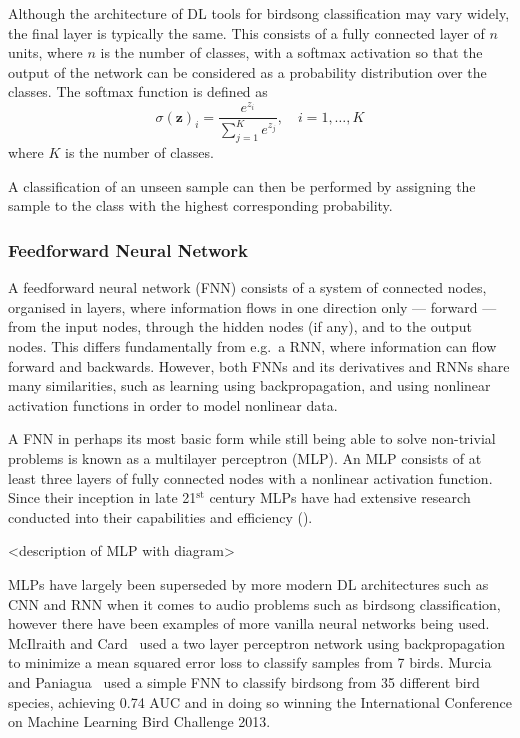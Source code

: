 Although the architecture of DL tools for birdsong classification may vary
widely, the final layer is typically the same. This consists of a fully
connected layer of $n$ units, where $n$ is the number of classes, with a softmax
activation so that the output of the network can be considered as a probability
distribution over the classes. The softmax function is defined as
\begin{equation}
\sigma{(\mathbf{z})}_i = \frac{e^{z_i}}
  {\sum_{j=1}^{K} e^{z_j}}, \hspace{1em} i = 1,\ldots,K
\end{equation}
where $K$ is the number of classes.

A classification of an unseen sample can then be performed by assigning the
sample to the class with the highest corresponding probability.

\subsubsection{Feedforward Neural Network}

A feedforward neural network (FNN) consists of a system of connected nodes,
organised in layers, where information flows in one direction only --- forward
--- from the input nodes, through the hidden nodes (if any), and to the output
nodes. This differs fundamentally from e.g.\ a RNN, where information can flow
forward and backwards. However, both FNNs and its derivatives and RNNs share
many similarities, such as learning using backpropagation, and using nonlinear
activation functions in order to model nonlinear data.

A FNN in perhaps its most basic form while still being able to solve non-trivial
problems is known as a multilayer perceptron (MLP). An MLP consists of at least
three layers of fully connected nodes with a nonlinear activation function.
Since their inception in late 21$^{\text{st}}$ century MLPs have had extensive research
conducted into their capabilities and efficiency (\cite{hornik1989multilayer}).

<description of MLP with diagram>

MLPs have largely been superseded by more modern DL architectures such as CNN and
RNN when it comes to audio problems such as birdsong classification, however
there have been examples of more vanilla neural networks being used. McIlraith
and Card~\cite{mcilraith1997birdsong} used a two layer perceptron network using
backpropagation to minimize a mean squared error loss to classify samples from 7
birds. Murcia and Paniagua~\cite{murcia2013bird} used a simple FNN to classify
birdsong from 35 different bird species, achieving 0.74 AUC and in doing so
winning the International Conference on Machine Learning Bird Challenge 2013.

